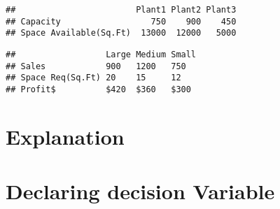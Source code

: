 \documentclass[
]{article}
\newenvironment{Shaded}{\begin{snugshade}}{\end{snugshade}}
\newcommand{\AttributeTok}[1]{\textcolor[rgb]{0.13,0.29,0.53}{#1}}
\newcommand{\ConstantTok}[1]{\textcolor[rgb]{0.56,0.35,0.01}{#1}}
\newcommand{\DecValTok}[1]{\textcolor[rgb]{0.00,0.00,0.81}{#1}}
\newcommand{\FunctionTok}[1]{\textcolor[rgb]{0.13,0.29,0.53}{\textbf{#1}}}
\newcommand{\NormalTok}[1]{#1}
\newcommand{\OtherTok}[1]{\textcolor[rgb]{0.56,0.35,0.01}{#1}}
\newcommand{\StringTok}[1]{\textcolor[rgb]{0.31,0.60,0.02}{#1}}
\begin{document}
\begin{verbatim}
##                        Plant1 Plant2 Plant3
## Capacity                  750    900    450
## Space Available(Sq.Ft)  13000  12000   5000
\end{verbatim}

\begin{Shaded}
\end{Shaded}

\begin{verbatim}
##                  Large Medium Small
## Sales            900   1200   750  
## Space Req(Sq.Ft) 20    15     12   
## Profit$          $420  $360   $300
\end{verbatim}

\hypertarget{explanation-1}{%
\section{Explanation}\label{explanation-1}}

\hypertarget{declaring-decision-variable-1}{%
\section{Declaring decision
Variable}\label{declaring-decision-variable-1}}
\end{document}

